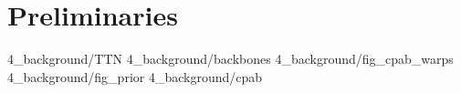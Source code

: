 \section{Preliminaries}\label{Sec:Background}
{4_background/TTN}\label{sec:TTN}
{4_background/backbones} \label{sec:DLTS}
{4_background/fig_cpab_warps}
{4_background/fig_prior}
{4_background/cpab}\label{sec:cpab}







